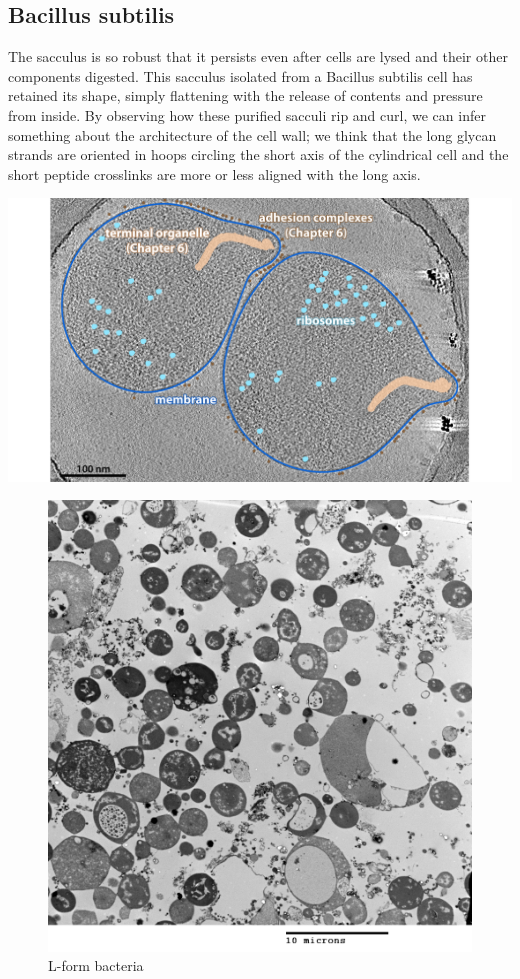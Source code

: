 \documentclass[]{tufte-book}
\begin{document}
\hypertarget{Peptidoglycan_architecture}{\subsection{Bacillus
subtilis}\label{Peptidoglycan_architecture}}

The sacculus is so robust that it persists even after cells are lysed
and their other components digested. This sacculus isolated from a
Bacillus subtilis cell has retained its shape, simply flattening with
the release of contents and pressure from inside. By observing how these
purified sacculi rip and curl, we can infer something about the
architecture of the cell wall; we think that the long glycan strands are
oriented in hoops circling the short axis of the cylindrical cell and
the short peptide crosslinks are more or less aligned with the long
axis.

\includegraphics{img/02_static/2_1_Mgenitalium}

\begin{figure}
\includegraphics{img/02_schematic/2_2_1_L_form_bacteria} \caption[L-form bacteria]{L-form bacteria}\label{fig:2-2-1}
\end{figure}
\end{document}
